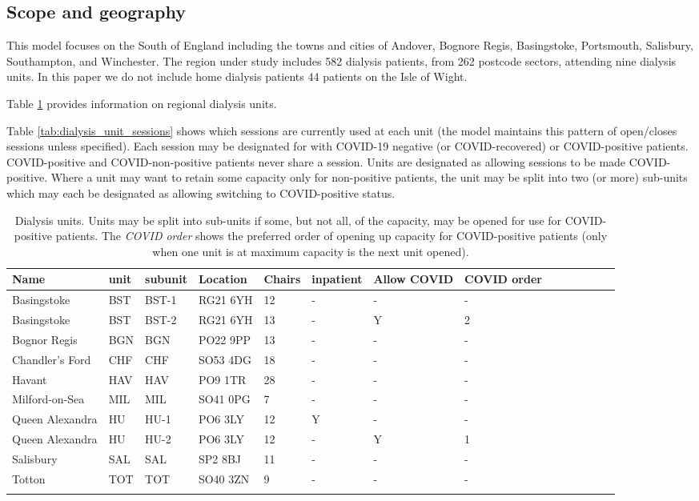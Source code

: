 \setcounter{page}{1}

\begin{appendices}
\setcounter{figure}{0}    
\section{Scope and geography}
\label{sec:geography}

This model focuses on the South of England including the towns and cities of Andover, Bognore Regis, Basingstoke, Portsmouth, Salisbury, Southampton, and Winchester. The region under study includes 582 dialysis patients, from 262 postcode sectors, attending nine dialysis units. In this paper we do not include home dialysis patients 44 patients on the Isle of Wight.

Table \ref{tab:dialysis_units} provides information on regional dialysis units.

Table \ref{tab:dialysis_unit_sessions} shows which sessions are currently used at each unit (the model maintains this pattern of open/closes sessions unless specified). Each session may be designated for with COVID-19 negative (or COVID-recovered) or COVID-positive patients. COVID-positive and COVID-non-positive patients never share a session. Units are designated as allowing sessions to be made COVID-positive. Where a unit may want to retain some capacity only for non-positive patients, the unit may be split into two (or more) sub-units which may each be designated as allowing switching to COVID-positive status.

\begin{minipage}{\textwidth}
\begin{longtable}[]{@{}llllllllllllll@{}}
\caption{Dialysis units. Units may be split into sub-units if some, but not all, of the capacity, may be opened for use for COVID-positive patients. The \emph{COVID order} shows the preferred order of opening up capacity for COVID-positive patients (only when one unit is at maximum capacity is the next unit opened).}\\
\toprule
\endhead
Name & unit & subunit & Location & Chairs & inpatient & Allow COVID & COVID order\tabularnewline
\midrule
Basingstoke & BST & BST-1 & RG21 6YH & 12 & - & - & - \tabularnewline
Basingstoke & BST & BST-2 & RG21 6YH & 13 & - & Y & 2 \tabularnewline
Bognor Regis & BGN & BGN & PO22 9PP & 13 & - & - & - \tabularnewline
Chandler's Ford & CHF & CHF & SO53 4DG & 18 & - & - & - \tabularnewline
Havant & HAV & HAV & PO9 1TR & 28 & - & - & - \tabularnewline
Milford-on-Sea & MIL & MIL & SO41 0PG & 7 & - & - & - \tabularnewline
Queen Alexandra & HU & HU-1 & PO6 3LY & 12 & Y & - & -\tabularnewline
Queen Alexandra & HU & HU-2 & PO6 3LY & 12 & - & Y & 1\tabularnewline
Salisbury & SAL & SAL & SP2 8BJ & 11 & - & - & -\tabularnewline
Totton & TOT & TOT & SO40 3ZN & 9 & - & - & -\tabularnewline
\bottomrule
\label{tab:dialysis_units}
\end{longtable}
\end{minipage}


\end{appendices}

